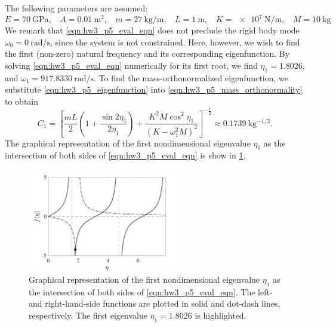 \begin{enumerate}[(i)]
{    The following parameters are assumed:
    \begin{equation}
        E = \qty{70}{\giga\pascal}, ~~~~ A = \qty{0.01}{\m\squared}, ~~~~ m = \qty{27}{\kg\per\m}, ~~~~ L = \qty{1}{\m}, ~~~~ K = \qty{e7}{\newton\per\m}, ~~~~ M = \qty{10}{\kg}
    \end{equation}
    We remark that \cref{eqn:hw3_p5_eval_eqn} does not preclude the rigid body mode $\omega_0 = \qty{0}{\radian\per\s}$, since the system is not constrained.
    Here, however, we wish to find the first (non-zero) natural frequency and its corresponding eigenfunction.
    By solving \cref{eqn:hw3_p5_eval_eqn} numerically for its first root, we find $\eta_1 = 1.8026$, and $\boxed{\omega_1 = \qty{917.8330}{\radian\per\s}}$.
    To find the mass-orthonormalized eigenfunction, we substitute \cref{eqn:hw3_p5_eigenfunction} into \cref{eqn:hw3_p5_mass_orthonormality} to obtain 
    \begin{equation}
        \boxed{C_1 = {\left[\frac{mL}{2}\left(1 + \frac{\sin 2\eta_1}{2\eta_1}\right) + \frac{K^2 M \cos^2 \eta_1}{{(K-\omega_1^2 M)}^2}\right]}^{-\frac{1}{2}} \approx \qty{0.1739}{\kg^{-1/2}}}. 
    \end{equation} 
    The graphical representation of the first nondimensional eigenvalue $\eta_1$ as the intersection of both sides of \cref{eqn:hw3_p5_eval_eqn} is show in \cref{fig:hw3_p5_intersect}.
    \begin{figure}[!ht]
        \centering
        \includegraphics[width=0.6\textwidth]{homework/hw3/assets/hw3_p5_intersect.pdf}
        \caption{Graphical representation of the first nondimensional eigenvalue $\eta_1$ as the intersection of both sides of \cref{eqn:hw3_p5_eval_eqn}. 
        The left- and right-hand-side functions are plotted in solid and dot-dash lines, respectively. 
        The first eigenvalue $\eta_1 = 1.8026$ is highlighted.}
        \label{fig:hw3_p5_intersect}
    \end{figure}
    
}
\end{enumerate}
